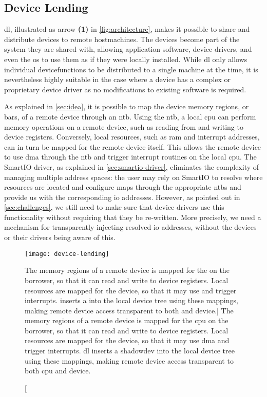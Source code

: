 \subsection{Device Lending}\label{sec:lending}
\Gls{dl}, illustrated as arrow \textbf{(1)} in \cref{fig:architecture}, makes it possible to share and distribute devices to remote \glspl{hostmachine}.
%
The devices become part of the system they are shared with, allowing application software, device drivers, and even the \gls{os} to use them as if they were locally installed.
%
While \gls{dl} only allows individual \glspl{devicefunction} to be distributed to a single machine at the time, it is nevertheless highly suitable in the case where a device has a complex or proprietary device driver as no modifications to existing software is required.


As explained in \cref{sec:idea}, it is possible to map the device memory regions, or \glspl{bar}, of a remote device through an \gls{ntb}.
%
Using the \gls{ntb}, a local \gls{cpu} can perform memory operations on a remote device, such as reading from and writing to device registers.
%
Conversely, local resources, such as \gls{ram} and interrupt addresses, can in turn be mapped for the remote device itself. 
%
This allows the remote device to use \gls{dma} through the \gls{ntb} and trigger interrupt routines on the local \gls{cpu}.
%
The SmartIO driver, as explained in \cref{sec:smartio-driver}, eliminates the complexity of managing multiple address spaces: the user may rely on SmartIO to resolve where resources are located and configure maps through the appropriate \glspl{ntb} and provide us with the corresponding \gls{io} addresses.
%
However, as pointed out in \cref{sec:challenges}, we still need to make sure that device drivers use this functionality without requiring that they be re-written. 
%
More precisely, we need a mechanism for transparently injecting resolved \gls{io} addresses, without the devices or their drivers being aware of this.



\begin{figure}
    \centering
    \texttt{[image: device-lending]}
    \caption
    [The memory regions of a remote device is mapped for the  on the borrower, so that it can read and write to device registers. Local resources are mapped for the device, so that it may use  and trigger interrupts.  inserts a  into the local device tree using these mappings, making remote device access transparent to both  and device.]
    {The memory regions of a remote device is mapped for the \gls{cpu} on the borrower, so that it can read and write to device registers. Local resources are mapped for the device, so that it may use \gls{dma} and trigger interrupts. \Gls{dl} inserts a \gls{shadowdev} into the local device tree using these mappings, making remote device access transparent to both \gls{cpu} and device.}
    \label{fig:device-lending}
\end{figure}


